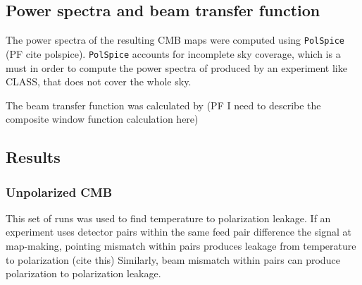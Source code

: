 \documentclass[a4paper,11pt]{article}
\begin{document}
\subsection{Power spectra and beam transfer function}

The power spectra of the resulting CMB maps were computed using \texttt{PolSpice} (PF cite polspice). \texttt{PolSpice} accounts for incomplete sky coverage, which is a must in order to compute the power spectra of produced by an experiment like CLASS, that does not cover the whole sky. 

The beam transfer function was calculated by (PF I need to describe the composite window function calculation here)

\subsection{Results}

\subsubsection{Unpolarized CMB}

This set of runs was used to find temperature to polarization leakage. If an experiment uses detector pairs within the same feed pair difference the signal at map-making, pointing mismatch within pairs produces leakage from temperature to polarization (cite this) Similarly, beam mismatch within pairs can produce polarization to polarization leakage. 
\end{document}
